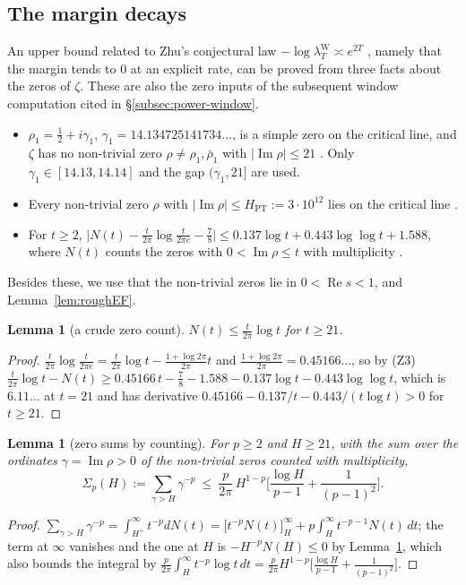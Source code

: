 \documentclass[10pt]{amsart}
\newtheorem{lemma}[theorem]{Lemma}
\theoremstyle{definition}
\theoremstyle{remark}
\newcommand{\Rel}{\operatorname{Re}}
\newcommand{\Iml}{\operatorname{Im}}
\newcommand{\lamW}{\lambda^{\mathrm W}_T}
\begin{document}
\subsection{The margin decays}\label{subsec:margin}
An upper bound related to Zhu's conjectural law $-\log\lamW\asymp e^{2T}$ \cite[Conj.~12.1]{Zhu2026}, namely that
the margin tends to $0$ at an explicit rate, can be proved from three facts about the zeros of $\zeta$.
These are also the zero inputs of the subsequent window computation cited in
\S\ref{subsec:power-window}.
\begin{itemize}
\item[(Z1)] $\rho_1=\frac12+i\gamma_1$, $\gamma_1=14.134725141734\ldots$, is a simple zero on the critical line,
and $\zeta$ has no non-trivial zero $\rho\ne\rho_1,\bar\rho_1$ with $|\Iml\rho|\le21$
\cite{RosserYoheSchoenfeld1968,PlattTrudgian2021}. Only $\gamma_1\in[14.13,14.14]$ and the gap $(\gamma_1,21]$
are used.
\item[(Z2)] Every non-trivial zero $\rho$ with $|\Iml\rho|\le H_{\mathrm{PT}}:=3\cdot10^{12}$ lies on the
critical line \cite{PlattTrudgian2021}.
\item[(Z3)] For $t\ge2$, $\big|N(t)-\frac t{2\pi}\log\frac t{2\pi e}-\frac78\big|\le0.137\log t+0.443\log\log t+1.588$,
where $N(t)$ counts the zeros with $0<\Iml\rho\le t$ with multiplicity \cite[Thm.~19]{Rosser1941}.
\end{itemize}
Besides these, we use that the non-trivial zeros lie in $0<\Rel s<1$, and Lemma~\ref{lem:roughEF}.
\begin{lemma}[a crude zero count]\label{lem:Ncount}
$N(t)\le\frac t{2\pi}\log t$ for $t\ge21$.
\end{lemma}
\begin{proof}
$\frac t{2\pi}\log\frac t{2\pi e}=\frac t{2\pi}\log t-\frac{1+\log2\pi}{2\pi}t$ and
$\frac{1+\log2\pi}{2\pi}=0.45166\ldots$, so by (Z3)
$\frac t{2\pi}\log t-N(t)\ge0.45166\,t-\frac78-1.588-0.137\log t-0.443\log\log t$, which is $6.11\ldots$ at
$t=21$ and has derivative $0.45166-0.137/t-0.443/(t\log t)>0$ for $t\ge21$.
\end{proof}

\begin{lemma}[zero sums by counting]\label{lem:zerosum}
For $p\ge2$ and $H\ge21$, with the sum over the ordinates $\gamma=\Iml\rho>0$ of the non-trivial zeros
counted with multiplicity,
\[
\Sigma_p(H):=\sum_{\gamma>H}\gamma^{-p}\ \le\ \frac p{2\pi}\,H^{1-p}\Big[\frac{\log H}{p-1}+\frac1{(p-1)^2}\Big].
\]
\end{lemma}
\begin{proof}
$\sum_{\gamma>H}\gamma^{-p}=\int_{H^+}^\infty t^{-p}dN(t)=\big[t^{-p}N(t)\big]_H^\infty+p\int_H^\infty t^{-p-1}N(t)\,dt$;
the term at $\infty$ vanishes and the one at $H$ is $-H^{-p}N(H)\le0$ by Lemma~\ref{lem:Ncount}, which
also bounds the integral by $\frac p{2\pi}\int_H^\infty t^{-p}\log t\,dt=\frac p{2\pi}H^{1-p}\big[\frac{\log H}{p-1}+\frac1{(p-1)^2}\big]$.
\end{proof}
\end{document}
